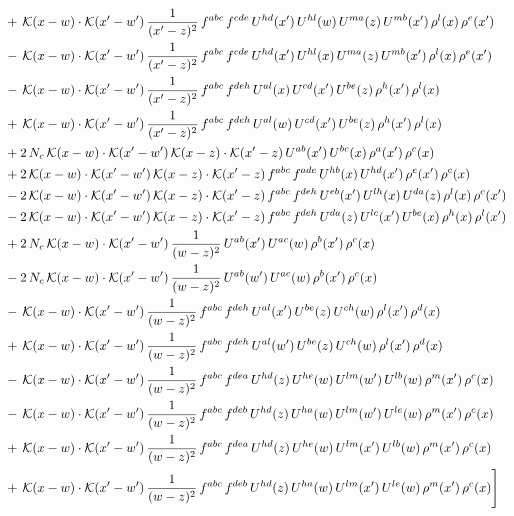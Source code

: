 \documentclass[9pt]{article}
\numberwithin{equation}{section}
\begin{document}
\begin{align}
&+\,\mathcal{K}(x-w)\cdot\mathcal{K}(x'-w')\,\frac{1}{(x'-z)^{2}}\,f^{abc}\,f^{cde}\,U^{hd}(x')\,U^{hl}(w)\,U^{ma}(z)\,U^{mb}(x')\,\rho^{l}(x)\,\rho^{e}(x')\notag\\
&-\,\mathcal{K}(x-w)\cdot\mathcal{K}(x'-w')\,\frac{1}{(x'-z)^{2}}\,f^{abc}\,f^{cde}\,U^{hd}(x')\,U^{hl}(x)\,U^{ma}(z)\,U^{mb}(x')\,\rho^{l}(x)\,\rho^{e}(x')\notag\\
&-\,\mathcal{K}(x-w)\cdot\mathcal{K}(x'-w')\,\frac{1}{(x'-z)^{2}}\,f^{abc}\,f^{deh}\,U^{al}(x)\,U^{cd}(x')\,U^{be}(z)\,\rho^{h}(x')\,\rho^{l}(x)\notag\\
&+\,\mathcal{K}(x-w)\cdot\mathcal{K}(x'-w')\,\frac{1}{(x'-z)^{2}}\,f^{abc}\,f^{deh}\,U^{al}(w)\,U^{cd}(x')\,U^{be}(z)\,\rho^{h}(x')\,\rho^{l}(x)\notag\\
&+2\,N_{c}\,\mathcal{K}(x-w)\cdot\mathcal{K}(x'-w')\,\mathcal{K}(x-z)\cdot\mathcal{K}(x'-z)\,U^{ab}(x')\,U^{bc}(x)\,\rho^{a}(x')\,\rho^{c}(x)\notag\\
&+2\,\mathcal{K}(x-w)\cdot\mathcal{K}(x'-w')\,\mathcal{K}(x-z)\cdot\mathcal{K}(x'-z)\,f^{abc}\,f^{ade}\,U^{hb}(x)\,U^{hd}(x')\,\rho^{e}(x')\,\rho^{c}(x)\notag\\
&-2\,\mathcal{K}(x-w)\cdot\mathcal{K}(x'-w')\,\mathcal{K}(x-z)\cdot\mathcal{K}(x'-z)\,f^{abc}\,f^{deh}\,U^{eb}(x')\,U^{lh}(x)\,U^{da}(z)\,\rho^{l}(x)\,\rho^{c}(x')\notag\\
&-2\,\mathcal{K}(x-w)\cdot\mathcal{K}(x'-w')\,\mathcal{K}(x-z)\cdot\mathcal{K}(x'-z)\,f^{abc}\,f^{deh}\,U^{da}(z)\,U^{lc}(x')\,U^{be}(x)\,\rho^{h}(x)\,\rho^{l}(x')\notag\\
&+2\,N_{c}\,\mathcal{K}(x-w)\cdot\mathcal{K}(x'-w')\,\frac{1}{(w-z)^{2}}\,U^{ab}(x')\,U^{ac}(w)\,\rho^{b}(x')\,\rho^{c}(x)\notag\\
&-2\,N_{c}\,\mathcal{K}(x-w)\cdot\mathcal{K}(x'-w')\,\frac{1}{(w-z)^{2}}\,U^{ab}(w')\,U^{ac}(w)\,\rho^{b}(x')\,\rho^{c}(x)\notag\\
&-\,\mathcal{K}(x-w)\cdot\mathcal{K}(x'-w')\,\frac{1}{(w-z)^{2}}\,f^{abc}\,f^{deh}\,U^{al}(x')\,U^{be}(z)\,U^{ch}(w)\,\rho^{l}(x')\,\rho^{d}(x)\notag\\
&+\,\mathcal{K}(x-w)\cdot\mathcal{K}(x'-w')\,\frac{1}{(w-z)^{2}}\,f^{abc}\,f^{deh}\,U^{al}(w')\,U^{be}(z)\,U^{ch}(w)\,\rho^{l}(x')\,\rho^{d}(x)\notag\\
&-\,\mathcal{K}(x-w)\cdot\mathcal{K}(x'-w')\,\frac{1}{(w-z)^{2}}\,f^{abc}\,f^{dea}\,U^{hd}(z)\,U^{he}(w)\,U^{lm}(w')\,U^{lb}(w)\,\rho^{m}(x')\,\rho^{c}(x)\notag\\
&-\,\mathcal{K}(x-w)\cdot\mathcal{K}(x'-w')\,\frac{1}{(w-z)^{2}}\,f^{abc}\,f^{deb}\,U^{hd}(z)\,U^{ha}(w)\,U^{lm}(w')\,U^{le}(w)\,\rho^{m}(x')\,\rho^{c}(x)\notag\\
&+\,\mathcal{K}(x-w)\cdot\mathcal{K}(x'-w')\,\frac{1}{(w-z)^{2}}\,f^{abc}\,f^{dea}\,U^{hd}(z)\,U^{he}(w)\,U^{lm}(x')\,U^{lb}(w)\,\rho^{m}(x')\,\rho^{c}(x)\notag\\
&+\,\mathcal{K}(x-w)\cdot\mathcal{K}(x'-w')\,\frac{1}{(w-z)^{2}}\,f^{abc}\,f^{deb}\,U^{hd}(z)\,U^{ha}(w)\,U^{lm}(x')\,U^{le}(w)\,\rho^{m}(x')\,\rho^{c}(x)\Bigg]
\end{align}
\end{document}
